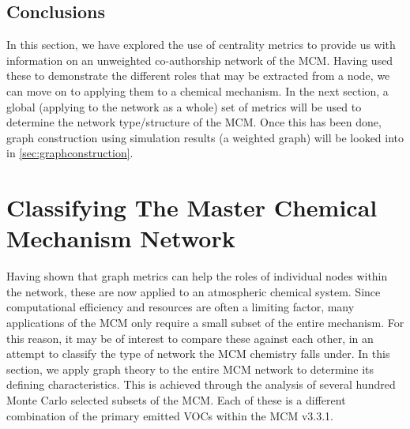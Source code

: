 \subsection{Conclusions}
In this section, we have explored the use of centrality metrics to provide us with information on an unweighted co-authorship network of the MCM. Having used these to demonstrate the different roles that may be extracted from a node, we can move on to applying them to a chemical mechanism. In the next section, a global (applying to the network as a whole) set of metrics will be used to determine the network type/structure of the MCM. Once this has been done, graph construction using simulation results (a weighted graph) will be looked into in \autoref{sec:graphconstruction}.
%
%


\section{Classifying The Master Chemical Mechanism Network}\label{sec:globalclass}

Having shown that graph metrics can help the roles of individual nodes within the network, these are now applied to an atmospheric chemical system. Since computational efficiency and resources are often a limiting factor, many applications of the MCM only require a small subset of the entire mechanism. For this reason, it may be of interest to compare these against each other, in an attempt to classify the type of network the MCM chemistry falls under. In this section, we apply graph theory to the entire MCM network to determine its defining characteristics. This is achieved through the analysis of several hundred Monte Carlo selected subsets of the MCM. Each of these is a different combination of the primary emitted VOCs within the MCM v3.3.1.

